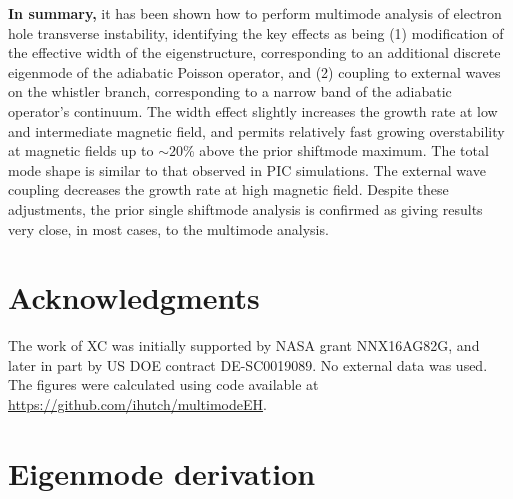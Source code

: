 \documentclass{jpp}
\begin{document}
\textbf{In summary,} it has been shown how to perform multimode
analysis of electron hole transverse instability, identifying the key
effects as being (1) modification of the effective width of the
eigenstructure, corresponding to an additional discrete eigenmode of
the adiabatic Poisson operator, and (2) coupling to external waves on
the whistler branch, corresponding to a narrow band of the adiabatic
operator's continuum. The width effect slightly increases the growth
rate at low and intermediate magnetic field, and permits relatively
fast growing overstability at magnetic fields up to $\sim20$\% above
the prior shiftmode maximum. The total mode shape is similar to that
observed in PIC simulations. The external wave coupling decreases the
growth rate at high magnetic field.  Despite these adjustments, the
prior single shiftmode analysis is confirmed as giving results very
close, in most cases, to the multimode analysis.

\section*{Acknowledgments}
The work of XC was initially supported by NASA grant NNX16AG82G, and
later in part by US DOE contract DE-SC0019089. No external data was
used. The figures were calculated using code available at
\url{https://github.com/ihutch/multimodeEH}.

\appendix
\section{Eigenmode derivation}
\end{document}
